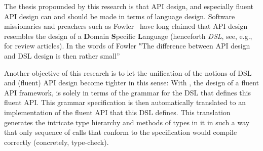The thesis propounded by this research is that API design, and especially
fluent API design
  can and should be made in terms of language design. Software missionaries
  and preachers such as Fowler~\cite{Fowler:2005} have long claimed that API
  design resembles the design of a \textbf Domain \textbf Specific \textbf
  Language (henceforth \emph{DSL}, see,
  e.g.,~\cite{VanDeursen:Klint:2000,Hudak:1997,Fowler:2010} for review
  articles).
   In the words of Fowler ‟The difference between API design and DSL design is
   then rather small”~\cite{Fowler:2005}

Another objective of this research is to let the unification of the notions of
DSL and (fluent) API design become tighter in this sense: With \Self, the
design of a fluent API framework, is solely in terms of the grammar for the DSL
that defines this fluent API\@. This grammar specification is then
automatically translated to an implementation of the fluent API that this DSL
defines. This translation generates the intricate type hierarchy
  and methods of types in it in such a way
  that only sequence of calls that conform
  to the specification would
  compile correctly (concretely, type-check).
  

